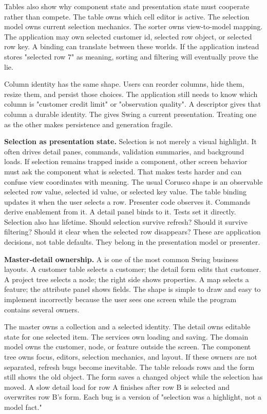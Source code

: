 Tables also show why component state and presentation state must cooperate rather than compete. The table owns which cell editor is active. The selection model owns current selection mechanics. The sorter owns view-to-model mapping. The application may own selected customer id, selected row object, or selected row key. A binding can translate between these worlds. If the application instead stores "selected row 7" as meaning, sorting and filtering will eventually prove the lie.

Column identity has the same shape. Users can reorder columns, hide them, resize them, and persist those choices. The application still needs to know which column is "customer credit limit" or "observation quality". A descriptor gives that column a durable identity. The  gives Swing a current presentation. Treating one as the other makes persistence and generation fragile.

\textbf{Selection as presentation state.} Selection is not merely a visual highlight. It often drives detail panes, commands, validation summaries, and background loads. If selection remains trapped inside a component, other screen behavior must ask the component what is selected. That makes tests harder and can confuse view coordinates with meaning. The usual Corusco shape is an observable selected row value, selected id value, or selected key value. The table binding updates it when the user selects a row. Presenter code observes it. Commands derive enablement from it. A detail panel binds to it. Tests set it directly. Selection also has lifetime. Should selection survive refresh? Should it survive filtering? Should it clear when the selected row disappears? These are application decisions, not table defaults. They belong in the presentation model or presenter.

\textbf{Master-detail ownership.} A  is one of the most common Swing business layouts. A customer table selects a customer; the detail form edits that customer. A project tree selects a node; the right side shows properties. A map selects a feature; the attribute panel shows fields. The shape is simple to draw and easy to implement incorrectly because the user sees one screen while the program contains several owners.

The master owns a collection and a selected identity. The detail owns editable state for one selected item. The services own loading and saving. The domain model owns the customer, node, or feature outside the screen. The component tree owns focus, editors, selection mechanics, and layout. If these owners are not separated, refresh bugs become inevitable. The table reloads rows and the form still shows the old object. The form saves a changed object while the selection has moved. A slow detail load for row A finishes after row B is selected and overwrites row B's form. Each bug is a version of "selection was a highlight, not a model fact."

